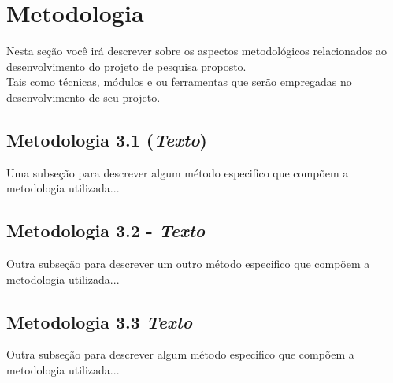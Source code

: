 \section{Metodologia}
\label{sec::metodologia}
Nesta seção você irá descrever sobre os aspectos metodológicos relacionados ao desenvolvimento do projeto de pesquisa proposto.\\
Tais como técnicas, módulos e ou ferramentas que serão empregadas no desenvolvimento de seu projeto.

\subsection{Metodologia 3.1 (\textit{Texto})}

Uma subseção para descrever algum método especifico que compõem a metodologia utilizada...


\subsection{Metodologia 3.2 - \textit{Texto}}
Outra subseção para descrever um outro método especifico que compõem a metodologia utilizada...


\subsection{Metodologia 3.3 \textit{Texto}}
Outra subseção para descrever algum método especifico que compõem a metodologia utilizada...